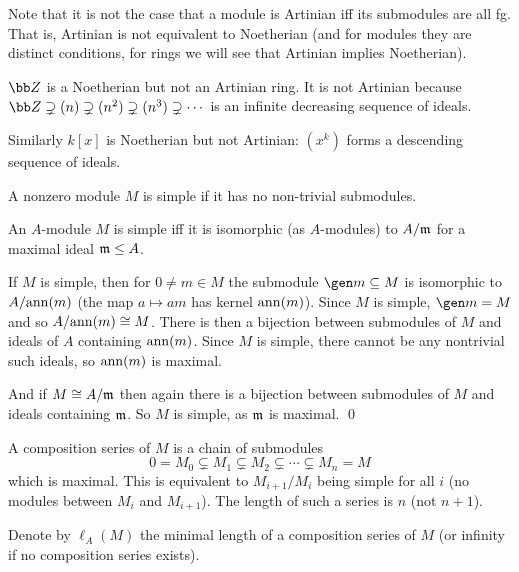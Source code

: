 Note that it is not the case that a module is Artinian iff its submodules are all fg.
That is, Artinian is not equivalent to Noetherian (and for modules they are distinct conditions, for rings we will see that Artinian implies Noetherian).

\bexam

    $\bZ$ is a Noetherian but not an Artinian ring.
    It is not Artinian because $\bZ\supsetneq(n)\supsetneq(n^2)\supsetneq(n^3)\supsetneq\cdots$ is an infinite decreasing sequence of ideals.

    Similarly $k[x]$ is Noetherian but not Artinian: $(x^k)$ forms a descending sequence of ideals.

\eexam

\bdefn

    A nonzero module $M$ is {\emphcolor simple} if it has no non-trivial submodules.

\edefn

\blemm

    An $A$-module $M$ is simple iff it is isomorphic (as $A$-modules) to $A/{{\frak m}}$ for a maximal ideal ${{\frak m}}\leq A$.

\elemm

\bproof

    If $M$ is simple, then for $0\neq m\in M$ the submodule $\gen m\subseteq M$ is isomorphic to $A/{\rm ann}(m)$ (the map $a\mapsto am$ has kernel ${\rm ann}(m)$).
    Since $M$ is simple, $\gen m=M$ and so $A/{\rm ann}(m)\cong M$.
    There is then a bijection between submodules of $M$ and ideals of $A$ containing ${\rm ann}(m)$.
    Since $M$ is simple, there cannot be any nontrivial such ideals, so ${\rm ann}(m)$ is maximal.

    And if $M\cong A/{{\frak m}}$ then again there is a bijection between submodules of $M$ and ideals containing ${{\frak m}}$.
    So $M$ is simple, as ${{\frak m}}$ is maximal.
    \qed

\eproof

\bdefn

    A {\emphcolor composition series} of $M$ is a chain of submodules
    $$ 0 = M_0 \subsetneq M_1 \subsetneq M_2 \subsetneq \cdots \subsetneq M_n = M $$
    which is maximal.
    This is equivalent to $M_{i+1}/M_i$ being simple for all $i$ (no modules between $M_i$ and $M_{i+1}$).
    The {\emphcolor length} of such a series is $n$ (not $n+1$).

    Denote by $\ell_A(M)$ the minimal length of a composition series of $M$ (or infinity if no composition series exists).

\edefn


